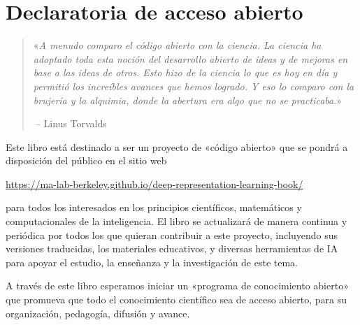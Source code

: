 \documentclass[../../book-main_es.tex]{subfiles}
\begin{document}
\chapter*{Declaratoria de acceso abierto}

\begin{quote}
    «{\em A menudo comparo el código abierto con la ciencia. La ciencia
        ha adoptado toda esta noción del desarrollo abierto de ideas y de mejoras 
        en base a las ideas de otros. Esto hizo de la
        ciencia lo que es hoy en día y permitió los increíbles avances que hemos
        logrado. Y eso lo comparo con la brujería y la alquimia, donde la
        abertura era algo que no se practicaba}.»

    $~$\hfill -- Linus Torvalds
\end{quote}
\vspace{5mm}

Este libro está destinado a ser un proyecto de «código abierto» que se pondrá
a disposición del público en el sitio web
\begin{center}
    \url{https://ma-lab-berkeley.github.io/deep-representation-learning-book/}
\end{center}
para todos los interesados en los principios científicos, matemáticos
y computacionales de la inteligencia. El libro se actualizará de manera
continua y periódica por todos los que quieran contribuir a
este proyecto, incluyendo sus versiones traducidas, los materiales educativos, 
y diversas herramientas de IA para apoyar
el estudio, la enseñanza y la investigación de este tema.

A través de este libro esperamos iniciar un «programa de conocimiento 
abierto» que promueva que todo el conocimiento científico sea de acceso 
abierto, para su organización, pedagogía, difusión y avance.
\end{document}
